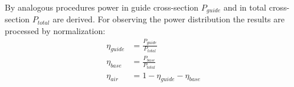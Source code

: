 By analogous procedures power in guide cross-section $P_{guide}$ and in total cross-section $P_{total}$ are derived. For observing the power distribution the results are processed by normalization:
\begin{align}
\eta_{guide}&=\frac{P_{guide}}{P_{total}}\\
\eta_{base}&=\frac{P_{base}}{P_{total}}\\
\eta_{air}&=1-\eta_{guide}-\eta_{base}
\end{align}
